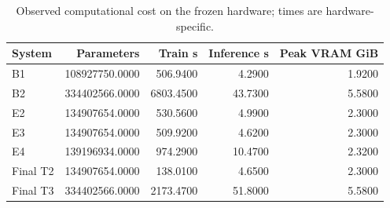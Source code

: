 \begin{table}[t]
\centering
\small
\caption{Observed computational cost on the frozen hardware; times are hardware-specific.}
\label{tab:cost}
\begin{tabular}{lrrrr}
\toprule
System & Parameters & Train s & Inference s & Peak VRAM GiB \\
\midrule
B1 & 108927750.0000 & 506.9400 & 4.2900 & 1.9200 \\
B2 & 334402566.0000 & 6803.4500 & 43.7300 & 5.5800 \\
E2 & 134907654.0000 & 530.5600 & 4.9900 & 2.3000 \\
E3 & 134907654.0000 & 509.9200 & 4.6200 & 2.3000 \\
E4 & 139196934.0000 & 974.2900 & 10.4700 & 2.3200 \\
Final T2 & 134907654.0000 & 138.0100 & 4.6500 & 2.3000 \\
Final T3 & 334402566.0000 & 2173.4700 & 51.8000 & 5.5800 \\
\bottomrule
\end{tabular}
\end{table}
